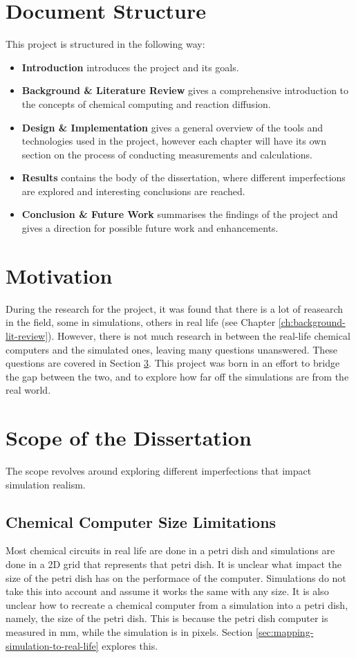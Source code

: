 \section{Document Structure}
This project is structured in the following way:

\begin{itemize}
    \item \textbf{Introduction} introduces the project and its goals.
    \item \textbf{Background \& Literature Review} gives a comprehensive introduction to the concepts of chemical computing and reaction diffusion.
    \item \textbf{Design \& Implementation} gives a general overview of the tools and technologies used in the project, however each chapter will have its own section on the process of conducting measurements and calculations.
    \item \textbf{Results} contains the body of the dissertation, where different imperfections are explored and interesting conclusions are reached.
    \item \textbf{Conclusion \& Future Work} summarises the findings of the project and gives a direction for possible future work and enhancements.
\end{itemize}

\section{Motivation}
During the research for the project, it was found that there is a lot of reasearch in the field, some in simulations, others in real life (see Chapter \ref{ch:background-lit-review}). 
However, there is not much research in between the real-life chemical computers and the simulated ones, leaving many questions unanswered. These questions are covered in Section \ref{sec:goals}.
This project was born in an effort to bridge the gap between the two, and to explore how far off the simulations are from the real world.


\section{Scope of the Dissertation}\label{sec:goals}
The scope revolves around exploring different imperfections that impact simulation realism.

\subsection{Chemical Computer Size Limitations} \label{sec:computer-size}
Most chemical circuits in real life are done in a petri dish and simulations are done in a 2D grid that represents that petri dish.
It is unclear what impact the size of the petri dish has on the performace of the computer. Simulations do not take this into account and assume it works the same with any size. 
It is also unclear how to recreate a chemical computer from a simulation into a petri dish, namely, the size of the petri dish. 
This is because the petri dish computer is measured in mm, while the simulation is in pixels. Section \ref{sec:mapping-simulation-to-real-life} explores this.

